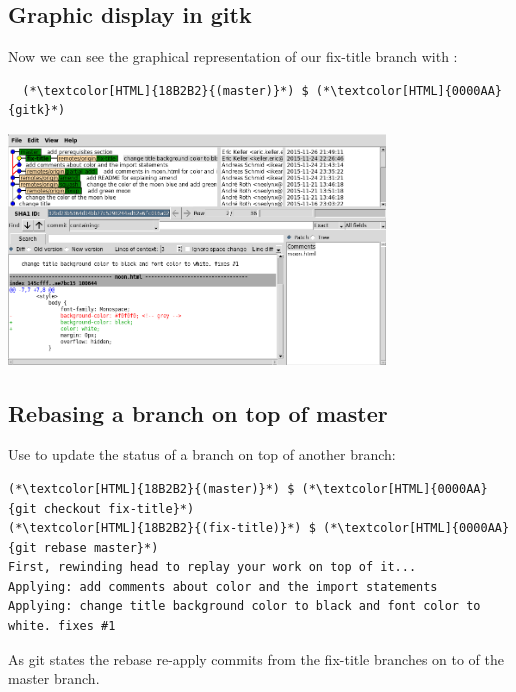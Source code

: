 \subsection{Graphic display in gitk}
\begin{frame}[fragile]
  \subslidetitle

  Now we can see the graphical representation of our fix-title branch with :
  \begin{lstlisting}
  (*\textcolor[HTML]{18B2B2}{(master)}*) $ (*\textcolor[HTML]{0000AA}{gitk}*)
\end{lstlisting}

  \vspace{1em}

  \centerline{\includegraphics[width=10cm]{../screen/gitk-fix-title.png}}

\end{frame}

\subsection{Rebasing a branch on top of master}
\begin{frame}[fragile]
  \subslidetitle

  Use  to update the status of a branch on top of another branch:

  \begin{lstlisting}
(*\textcolor[HTML]{18B2B2}{(master)}*) $ (*\textcolor[HTML]{0000AA}{git checkout fix-title}*)
(*\textcolor[HTML]{18B2B2}{(fix-title)}*) $ (*\textcolor[HTML]{0000AA}{git rebase master}*)
First, rewinding head to replay your work on top of it...
Applying: add comments about color and the import statements
Applying: change title background color to black and font color to white. fixes #1
\end{lstlisting}

  As git states the rebase re-apply commits from the fix-title branches on to of the master branch.

\end{frame}

